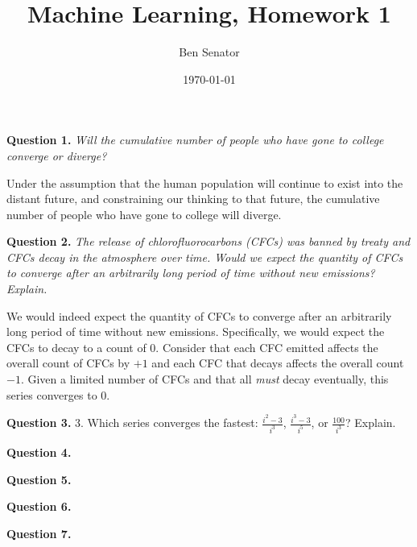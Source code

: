 \documentclass[11pt]{article}
\title{Machine Learning, Homework 1}
\author{Ben Senator}
\date{\today}
\begin{document}
\maketitle

\textbf{Question 1.} \textit{Will the cumulative number of people who have gone to college converge or diverge?}

Under the assumption that the human population will continue to exist into the distant future, and constraining our thinking to that future, the cumulative number of people who have gone to college will diverge.

\textbf{Question 2.} \textit{The release of chlorofluorocarbons (CFCs) was banned by treaty and CFCs decay in the atmosphere over time. Would we expect the quantity of CFCs to converge after an arbitrarily long period of time without new emissions? Explain.}

We would indeed expect the quantity of CFCs to converge after an arbitrarily long period of time without new emissions. 
Specifically, we would expect the CFCs to decay to a count of 0. 
Consider that each CFC emitted affects the overall count of CFCs by $+1$ and each CFC that decays affects the overall count $-1$.
Given a limited number of CFCs and that all \textit{must} decay eventually, this series converges to 0.

\textbf{Question 3.} 3. Which series converges the fastest: $\frac{i^2-3}{i^3}$, $\frac{i^3-3}{i^5}$, or $\frac{100}{i^3}$? Explain.



\textbf{Question 4.}

\textbf{Question 5.}

\textbf{Question 6.}

\textbf{Question 7.}
\end{document}
